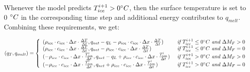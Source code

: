 \documentclass[utf8]{frontiersSCNS} %
\begin{document}
Whenever the model predicts $T_{ice}^{i+1} > 0 \degree C$, then the surface temperature is set to 0 $\degree C$ in the
corresponding time step and additional energy contributes to $q_{melt}$. Combining these requirements, we get:

\begin{equation} (q_{T}, q_{melt}) = \left\{ \begin{array}{ll} ( \rho_{ice} \cdot c_{ice} \cdot  \Delta x \cdot
    \frac{\Delta T}{\Delta t}, q_{net}-q_{L}-\rho_{ice} \cdot c_{ice} \cdot  \Delta x \cdot \frac{\Delta T}{\Delta t})
    & \textit{ if } T_{ice}^{i+1}\leq 0 \degree C \textit{ and } \Delta M_{F} > 0\\ ( \rho_{ice} \cdot c_{ice} \cdot  \Delta x
    \cdot \frac{\Delta T}{\Delta t}, q_{net}-\rho_{ice} \cdot c_{ice} \cdot  \Delta x \cdot \frac{\Delta T}{\Delta t})
    & \textit{ if } T_{ice}^{i+1}\leq 0 \degree C \textit{ and } \Delta M_{F} = 0\\
        ( -\rho_{ice} \cdot c_{ice} \cdot  \Delta x \cdot \frac{T_{ice}^{i}}{\Delta t}, q_{net}-q_{L}+\rho_{ice} \cdot
    c_{ice} \cdot \Delta x \cdot \frac{T_{ice}^{i}}{\Delta t}) & \textit{ if } T_{ice}^{i+1}> 0 \degree C \textit{ and } \Delta
    M_{F} > 0\\ ( -\rho_{ice} \cdot c_{ice} \cdot  \Delta x \cdot \frac{T_{ice}^{i}}{\Delta t}, q_{net}+\rho_{ice}
    \cdot c_{ice} \cdot  \Delta x \cdot \frac{T_{ice}^{i}}{\Delta t}) & \textit{ if } T_{ice}^{i+1}> 0 \degree C \textit{ and }
\Delta M_{F} = 0\\ \end{array} \right.  \label{eqn:qt} \end{equation}
\end{document}
